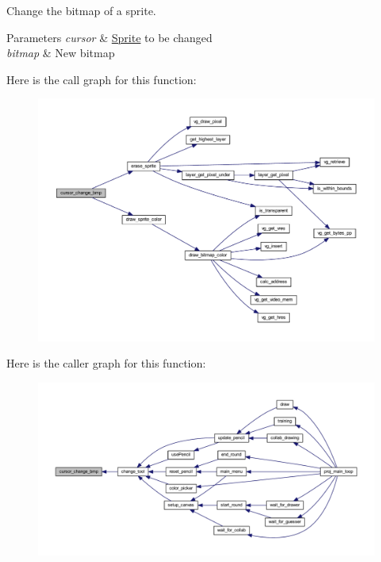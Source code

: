 Change the bitmap of a sprite. 


\begin{DoxyParams}{Parameters}
{\em cursor} & \mbox{\hyperlink{struct_sprite}{Sprite}} to be changed \\
\hline
{\em bitmap} & New bitmap \\
\hline
\end{DoxyParams}
Here is the call graph for this function\+:\nopagebreak
\begin{figure}[H]
\begin{center}
\leavevmode
\includegraphics[width=350pt]{group__sprite_gad12aa07248bed260a545f3ee69372842_cgraph}
\end{center}
\end{figure}
Here is the caller graph for this function\+:\nopagebreak
\begin{figure}[H]
\begin{center}
\leavevmode
\includegraphics[width=350pt]{group__sprite_gad12aa07248bed260a545f3ee69372842_icgraph}
\end{center}
\end{figure}
\mbox{\label{group__sprite_gae179135dc9bd1c7da4a8eb774237ec7e}} 
